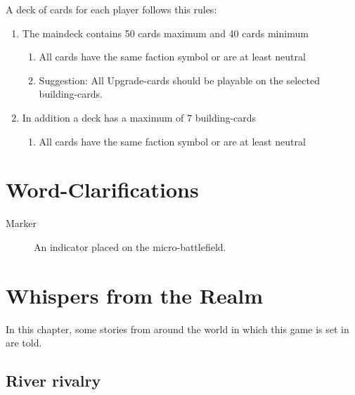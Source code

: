 \documentclass[a5paper,pagesize,10pt,bibtotoc,pointlessnumbers,
normalheadings,DIV=9,twoside=false]{scrbook}
\begin{document}
A deck of cards for each player follows this rules:

\begin{enumerate}
\item The maindeck contains 50 cards maximum and 40 cards minimum
\begin{enumerate}
\item All cards have the same faction symbol or are at least neutral
\item Suggestion: All Upgrade-cards should be playable on the selected building-cards.
\end{enumerate}
\item In addition a deck has a maximum of 7 building-cards
\begin{enumerate}
\item All cards have the same faction symbol or are at least neutral
\end{enumerate}
\end{enumerate}

\chapter{Word-Clarifications}

\begin{description}
\item[Marker]
An indicator placed on the micro-battlefield.
\end{description}


\chapter{Whispers from the Realm}

In this chapter, some stories from around the world in which this game is set in are told.

\section{River rivalry}
\end{document}
